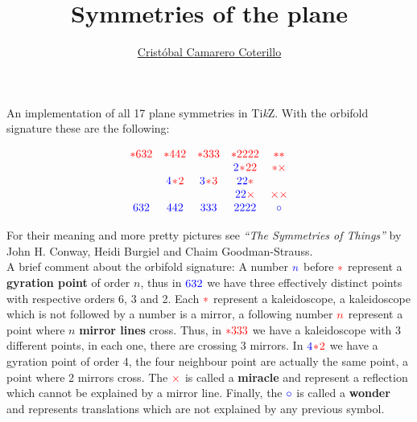 \documentclass[a4paper, 12pt, landscape]{article}
\newcommand\titulo{Symmetries of the plane}
\newcommand\autor{\href{http://www.alumnos.unican.es/ccc66}
  {Cristóbal Camarero Coterillo}}
\begin{document}
\title{\titulo}
\author{\autor}
\date{}
\maketitle%

An implementation of all 17 plane symmetries in Ti\textit{k}Z.
With the orbifold signature these are the following:

\[\color{red}
\begin{array}{ccccc}
*632				&	*442					&	*333					&	*2222					&	**	\\
					&							&							&	{\color{blue}2}\!*\!22	&	*\times\\
					&	{\color{blue}4}\!*\!2	&	{\color{blue}3}\!*\!3	&	{\color{blue}22}*		&		\\
					&							&							&	{\color{blue}22}\times	&\times\times\\
{\color{blue}632}	&	{\color{blue}442}		&	{\color{blue}333}		&	{\color{blue}2222}		&	{\color{blue}\circ}\\
\end{array}
\]

For their meaning and more pretty pictures see \textit{``The Symmetries of Things''}
by John H. Conway, Heidi Burgiel and Chaim Goodman-Strauss.\\

A brief comment about the orbifold signature:
A number $\color{blue}n$ before $\color{red}*$ represent a \textbf{gyration
point} of order $n$, thus in $\color{blue}632$ we have three effectively
distinct points with respective orders 6, 3 and 2.  Each $\color{red}*$
represent a kaleidoscope, a kaleidoscope which is not followed by a number is a
mirror, a following number $\color{red}n$ represent a point where $n$
\textbf{mirror lines} cross.  Thus, in $\color{red}*333$ we have a kaleidoscope
with 3 different points, in each one, there are crossing 3 mirrors.  In
$\color{blue}4\!\color{red}*\!2$ we have a gyration point of order 4, the four
neighbour point are actually the same point, a point where 2 mirrors cross.
The $\color{red}\times$ is called a \textbf{miracle} and represent a reflection
which cannot be explained by a mirror line.  Finally, the $\color{blue}\circ$
is called a \textbf{wonder} and represents translations which
are not explained by any previous symbol.

\newsavebox{\piece}%
\clearpage
\end{document}
